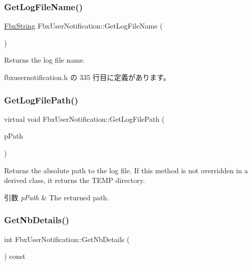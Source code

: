 \subsubsection{\texorpdfstring{Get\+Log\+File\+Name()}{GetLogFileName()}}
{\footnotesize\ttfamily \hyperlink{class_fbx_string}{Fbx\+String} Fbx\+User\+Notification\+::\+Get\+Log\+File\+Name (\begin{DoxyParamCaption}{ }\end{DoxyParamCaption})\hspace{0.3cm}{\ttfamily [inline]}}

Returns the log file name. 

 fbxusernotification.\+h の 335 行目に定義があります。

\mbox{\label{class_fbx_user_notification_af261ffb4073bb573710dc59b4881b759}} 
\subsubsection{\texorpdfstring{Get\+Log\+File\+Path()}{GetLogFilePath()}}
{\footnotesize\ttfamily virtual void Fbx\+User\+Notification\+::\+Get\+Log\+File\+Path (\begin{DoxyParamCaption}\item[{\hyperlink{class_fbx_string}{Fbx\+String} \&}]{p\+Path }\end{DoxyParamCaption})\hspace{0.3cm}{\ttfamily [virtual]}}

Returns the absolute path to the log file. If this method is not overridden in a derived class, it returns the T\+E\+MP directory. 
\begin{DoxyParams}{引数}
{\em p\+Path} & The returned path. \\
\hline
\end{DoxyParams}
\mbox{\label{class_fbx_user_notification_a1c5bdc6db66e58957abec1cc7d5349a2}} 
\subsubsection{\texorpdfstring{Get\+Nb\+Details()}{GetNbDetails()}}
{\footnotesize\ttfamily int Fbx\+User\+Notification\+::\+Get\+Nb\+Details (\begin{DoxyParamCaption}{ }\end{DoxyParamCaption}) const}



